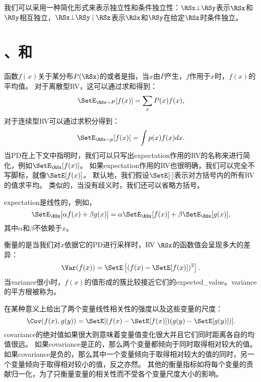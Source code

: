 我们可以采用一种简化形式来表示独立性和条件独立性：$\RSx \bot \RSy$表示$\RSx$和$\RSy$相互独立，$\RSx \bot \RSy \mid \RSz$表示$\RSx$和$\RSy$在给定$\RSz$时条件独立。

\section{、和}
\label{sec:expectation_variance_and_covariance}

函数$f(x)$关于某分布$P(\RSx)$的或者是指，当$x$由$P$产生，$f$作用于$x$时，$f(x)$的平均值。
对于离散型\gls{RV}，这可以通过求和得到：
\begin{equation}
\SetE_{\RSx \sim P}[f(x)] = \sum_x P(x)f(x),
\end{equation}
对于连续型\gls{RV}可以通过求积分得到：
\begin{equation}
\SetE_{\RSx \sim p}[f(x)] = \int p(x)f(x)dx.
\end{equation}
当\gls{PD}在上下文中指明时，我们可以只写出\gls{expectation}作用的\gls{RV}的名称来进行简化，例如$\SetE_{\RSx}[f(x)]$。
如果\gls{expectation}作用的\gls{RV}也很明确，我们可以完全不写脚标，就像$\SetE[f(x)]$。
默认地，我们假设$\SetE[\cdot]$表示对方括号内的所有\gls{RV}的值求平均。
类似的，当没有歧义时，我们还可以省略方括号。


\gls{expectation}是线性的，例如，
\begin{equation}
\SetE_{\RSx}[\alpha f(x) + \beta g(x)] = \alpha \SetE_{\RSx}[f(x)] + \beta \SetE_{\RSx}[g(x)],
\end{equation}
其中$\alpha$和$\beta$不依赖于$x$。

衡量的是当我们对$x$依据它的\gls{PD}进行采样时，\gls{RV} $\RSx$的函数值会呈现多大的差异：
\begin{equation}
\Var(f(x)) = \SetE \left [(f(x) - \SetE[f(x)])^2 \right].
\end{equation}
当\gls{variance}很小时，$f(x)$的值形成的簇比较接近它们的\gls{expected_value}。\gls{variance}的平方根被称为。

在某种意义上给出了两个变量线性相关性的强度以及这些变量的尺度：
\begin{equation}
\Cov(f(x), g(y)) = \SetE[ ( f(x)-\SetE[f(x)] )( g(y)-\SetE[g(y)] ) ].
\end{equation}
\gls{covariance}的绝对值如果很大则意味着变量值变化很大并且它们同时距离各自的均值很远。
如果\gls{covariance}是正的，那么两个变量都倾向于同时取得相对较大的值。
如果\gls{covariance}是负的，那么其中一个变量倾向于取得相对较大的值的同时，另一个变量倾向于取得相对较小的值，反之亦然。
其他的衡量指标如将每个变量的贡献归一化，为了只衡量变量的相关性而不受各个变量尺度大小的影响。

